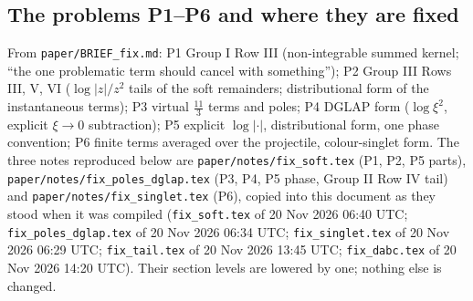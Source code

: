 \documentclass[10pt]{article}
\begin{document}
\subsection{The problems P1--P6 and where they are fixed}
\noindent From \texttt{paper/BRIEF\_fix.md}: P1 Group I Row III (non-integrable summed kernel; ``the one problematic term should cancel with something''); P2 Group III Rows III, V, VI ($\log|z|/z^{2}$ tails of the soft remainders; distributional form of the instantaneous terms); P3 virtual $\frac{11}{3}$ terms and poles; P4 DGLAP form ($\log\xi^{2}$, explicit $\xi\to0$ subtraction); P5 explicit $\log|\cdot|$, distributional form, one phase convention; P6 finite terms averaged over the projectile, colour-singlet form. The three notes reproduced below are \texttt{paper/notes/fix\_soft.tex} (P1, P2, P5 parts), \texttt{paper/notes/fix\_poles\_dglap.tex} (P3, P4, P5 phase, Group II Row IV tail) and \texttt{paper/notes/fix\_singlet.tex} (P6), copied into this document as they stood when it was compiled (\texttt{fix\_soft.tex} of 20 Nov 2026 06:40 UTC; \texttt{fix\_poles\_dglap.tex} of 20 Nov 2026 06:34 UTC; \texttt{fix\_singlet.tex} of 20 Nov 2026 06:29 UTC; \texttt{fix\_tail.tex} of 20 Nov 2026 13:45 UTC; \texttt{fix\_dabc.tex} of 20 Nov 2026 14:20 UTC). Their section levels are lowered by one; nothing else is changed.
\end{document}
